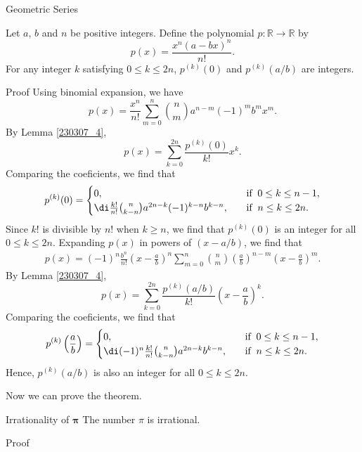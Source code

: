 \begin{example}[label=230305_16]{Geometric Series}
\begin{example}[label=230304_9]{}
\begin{example}{}
\begin{example}{}
\begin{lemma}[label=230309_2]{}
Let $a$, $b$ and $n$ be positive integers. Define the polynomial $p:\mathbb{R}\to\mathbb{R}$ by
\[p(x)=\frac{x^n(a-bx)^n}{n!}.\]
For any  integer $k$ satisfying $0\leq k\leq 2n$, $p^{(k)}(0)$ and $p^{(k)}(a/b)$ are integers.
\end{lemma}
\begin{myproof}{Proof} 
Using binomial expansion, we have
\[p(x)=\frac{x^n}{n!}\sum_{m=0}^n \binom{n}{m}a^{n-m}(-1)^mb^mx^m.\]
By Lemma \ref{230307_4},
\[p(x)=\sum_{k=0}^{2n}\frac{p^{(k)}(0)}{k!}x^k.\] 
Comparing the coeficients, we find that   
\begin{align*}
p^{(k)}(0)=\begin{cases}0,\quad &\text{if}\; \;0\leq k\leq n-1,\\ \di
 \frac{k!}{n!}\binom{n}{k-n}a^{2n-k}(-1)^{k-n}b^{k-n},\quad &\text{if}\;\;n\leq k\leq 2n.\end{cases}\end{align*}Since $k!$ is divisible by $n!$ when $k\geq n$, we find  that $p^{(k)}(0)$ is an integer for all $0\leq k\leq 2n$.
Expanding $p(x)$ in powers of $(x-a/b)$, we find that
\begin{align*}
p(x)=(-1)^n\frac{b^n}{n!}\left(x-\frac{a}{b}\right)^n\sum_{m=0}^n\binom{n}{m}\left(\frac{a}{b}\right)^{n-m}\left(x-\frac{a}{b}\right)^m.
\end{align*}
By Lemma \ref{230307_4},
\[p(x)=\sum_{k=0}^{2n}\frac{p^{(k)}(a/b)}{k!}\left(x-\frac{a}{b}\right)^k.\]  \bp
Comparing the coeficients, 
we find that
\begin{align*}p^{(k)}\left(\frac{a}{b}\right)=\begin{cases}0,\quad &\text{if}\; \;0\leq k\leq n-1,\\ \di (-1)^n\frac{k!}{n!}\binom{n}{k-n}a^{2n-k}b^{k-n},\quad &\text{if}\;\;n\leq k\leq 2n.\end{cases}\end{align*}
Hence, $p^{(k)}(a/b)$ is also an integer  for all $0\leq k\leq 2n$.
\end{myproof}

Now we can prove the theorem.
\begin{theorem}{Irrationality of $\pmb{\pi}$}
The number $\pi$ is irrational.

\end{theorem}
\begin{myproof}{Proof}



\end{myproof}
\end{example}
\end{example}
\end{example}
\end{example}
